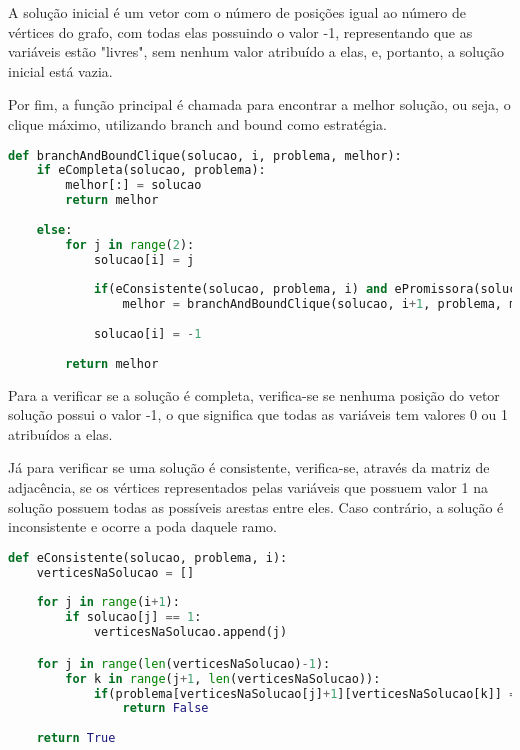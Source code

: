\documentclass[12pt]{article}
\begin{document}
    \par A solução inicial é um vetor com o número de posições igual ao número de vértices do grafo, com todas elas possuindo o valor -1, representando que as variáveis estão "livres", sem nenhum valor atribuído a elas, e, portanto, a solução inicial está vazia.

    \par Por fim, a função principal é chamada para encontrar a melhor solução, ou seja, o clique máximo, utilizando branch and bound como estratégia.
\begin{lstlisting}[caption={Função que encontra o clique máximo através de branch and bound},label={lst:codClique2},language=Python]
def branchAndBoundClique(solucao, i, problema, melhor):
    if eCompleta(solucao, problema):
        melhor[:] = solucao
        return melhor
    
    else:
        for j in range(2):
            solucao[i] = j
            
            if(eConsistente(solucao, problema, i) and ePromissora(solucao, problema, melhor, i)):
                melhor = branchAndBoundClique(solucao, i+1, problema, melhor)
            
            solucao[i] = -1
        
        return melhor
 \end{lstlisting}

     \par Para a verificar se a solução é completa, verifica-se se nenhuma posição do vetor solução possui o valor -1, o que significa que todas as variáveis tem valores 0 ou 1 atribuídos a elas.

     \par Já para verificar se uma solução é consistente, verifica-se, através da matriz de adjacência, se os vértices representados pelas variáveis que possuem valor 1 na solução possuem todas as possíveis arestas entre eles. Caso contrário, a solução é inconsistente e ocorre a poda daquele ramo.
\begin{lstlisting}[caption={Função que verifica a consistência da solução até o momento},label={lst:codClique3},language=Python]
def eConsistente(solucao, problema, i):
    verticesNaSolucao = []
    
    for j in range(i+1):
        if solucao[j] == 1:
            verticesNaSolucao.append(j)

    for j in range(len(verticesNaSolucao)-1):
        for k in range(j+1, len(verticesNaSolucao)):
            if(problema[verticesNaSolucao[j]+1][verticesNaSolucao[k]] == 0):
                return False
            
    return True 
 \end{lstlisting}
\end{document}
